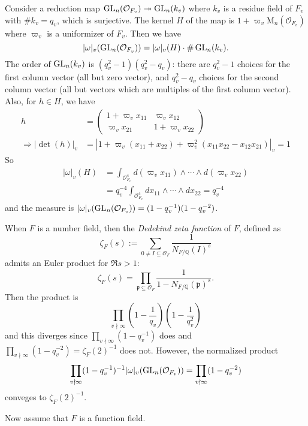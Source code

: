 \begin{problem} \notfinish
\end{problem}
\begin{problem} \notfinish
\end{problem}

\begin{problem} \notfinish
Consider a reduction map $\operatorname{\mathrm{GL}}_n(\mathcal{O}_{F_v}) \twoheadrightarrow \operatorname{\mathrm{GL}}_n(k_v)$ where $k_v$ is a residue field of $F_v$ with $\#k_v = q_v$,
which is surjective.
The kernel $H$ of the map is $1 + \varpi_v\mathrm{M}_{n}(\mathcal{O}_{F_v})$ where $\varpi_v$ is a uniformizer of $F_v$.
Then we have 
$$
|\omega|_v(\operatorname{\mathrm{GL}}_{n}(\mathcal{O}_{F_v})) = |\omega|_v(H) \cdot \# \operatorname{\mathrm{GL}}_{n}(k_v).
$$
The order of $\operatorname{\mathrm{GL}}_n(k_v)$ is $(q_v^2 - 1)(q_v^2 - q_v)$: there are $q_v^2 - 1$ choices for the first column vector (all but zero vector), and $q_v^2 - q_v$
choices for the second column vector (all but vectors which are multiples of the first column vector).
Also, for $h \in H$, we have
\begin{align*}
h &= \begin{pmatrix}
    1 + \varpi_v x_{11} & \varpi_v x_{12} \\ 
    \varpi_v x_{21} & 1 + \varpi_v x_{22}
\end{pmatrix}  \\
\Rightarrow |\det(h)|_v &= |1 + \varpi_v(x_{11} + x_{22}) + \varpi_v^{2} (x_{11}x_{22} - x_{12}x_{21})|_v = 1
\end{align*}
So
\begin{align*}
    |\omega|_v(H) &= \int_{\mathcal{O}_{F_v}^{4}} d(\varpi_v x_{11}) \wedge \cdots \wedge d(\varpi_v x_{22}) \\
    &= q_{v}^{-4}\int_{\mathcal{O}_{F_v}^{4}} dx_{11} \wedge \cdots \wedge dx_{22} = q_{v}^{-4}
\end{align*}
and the measure is $|\omega|_{v}(\operatorname{\mathrm{GL}}_n(\mathcal{O}_{F_v})) = (1 - q_{v}^{-1})(1 - q_{v}^{-2})$.

When $F$ is a number field, then the \emph{Dedekind zeta function} of $F$, defined as
$$
\zeta_F(s) := \sum_{0 \neq I \subseteq \mathcal{O}_F} \frac{1}{N_{F/\mathbb{Q}}(I)^{s}}
$$
admits an Euler product for $\Re s > 1$:
$$
\zeta_F(s) = \prod_{\mathfrak{p} \subseteq \mathcal{O}_{F}} \frac{1}{1 - N_{F/\mathbb{Q}}(\mathfrak{p})^{s}}.
$$
Then the product is 
$$
\prod_{v\nmid \infty} \left( 1 - \frac{1}{q_v}\right) \left(1 - \frac{1}{q_{v}^{2}}\right)
$$
and this diverges since $\prod_{v\nmid \infty} (1 - q_{v}^{-1})$ does and $\prod_{v\nmid \infty}(1 - q_{v}^{-2}) = \zeta_F(2)^{-1}$ does not.
However, the normalized product
$$
\prod_{v\nmid \infty} (1 - q_{v}^{-1})^{-1} |\omega|_{v}(\operatorname{\mathrm{GL}}_{n}(\mathcal{O}_{F_v})) = \prod_{v\nmid \infty} (1 - q_{v}^{-2})
$$
conveges to $\zeta_{F}(2)^{-1}$.

Now assume that $F$ is a function field.
\end{problem}


